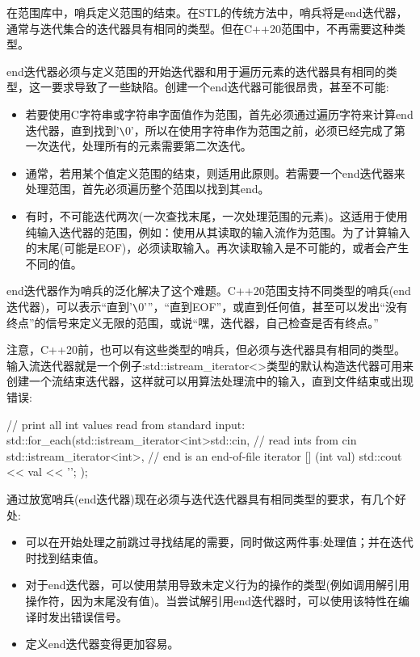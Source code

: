 在范围库中，哨兵定义范围的结束。在STL的传统方法中，哨兵将是end迭代器，通常与迭代集合的迭代器具有相同的类型。但在C++20范围中，不再需要这种类型。

end迭代器必须与定义范围的开始迭代器和用于遍历元素的迭代器具有相同的类型，这一要求导致了一些缺陷。创建一个end迭代器可能很昂贵，甚至不可能:

\begin{itemize}
\item
若要使用C字符串或字符串字面值作为范围，首先必须通过遍历字符来计算end迭代器，直到找到'\verb|\|0'，所以在使用字符串作为范围之前，必须已经完成了第一次迭代，处理所有的元素需要第二次迭代。

\item
通常，若用某个值定义范围的结束，则适用此原则。若需要一个end迭代器来处理范围，首先必须遍历整个范围以找到其end。

\item
有时，不可能迭代两次(一次查找末尾，一次处理范围的元素)。这适用于使用纯输入迭代器的范围，例如：使用从其读取的输入流作为范围。为了计算输入的末尾(可能是EOF)，必须读取输入。再次读取输入是不可能的，或者会产生不同的值。
\end{itemize}

end迭代器作为哨兵的泛化解决了这个难题。C++20范围支持不同类型的哨兵(end迭代器)，可以表示“直到'\verb|\|0'”，“直到EOF”，或直到任何值，甚至可以发出“没有终点”的信号来定义无限的范围，或说“嘿，迭代器，自己检查是否有终点。”

注意，C++20前，也可以有这些类型的哨兵，但必须与迭代器具有相同的类型。输入流迭代器就是一个例子:std::istream\_iterator<>类型的默认构造迭代器可用来创建一个流结束迭代器，这样就可以用算法处理流中的输入，直到文件结束或出现错误:

\begin{cpp}
// print all int values read from standard input:
std::for_each(std::istream_iterator<int>{std::cin}, // read ints from cin
		std::istream_iterator<int>{}, // end is an end-of-file iterator
		[] (int val) {
			std::cout << val << '\n';
		});
\end{cpp}

通过放宽哨兵(end迭代器)现在必须与迭代迭代器具有相同类型的要求，有几个好处:

\begin{itemize}
\item
可以在开始处理之前跳过寻找结尾的需要，同时做这两件事:处理值；并在迭代时找到结束值。

\item
对于end迭代器，可以使用禁用导致未定义行为的操作的类型(例如调用解引用操作符，因为末尾没有值)。当尝试解引用end迭代器时，可以使用该特性在编译时发出错误信号。

\item
定义end迭代器变得更加容易。
\end{itemize}

